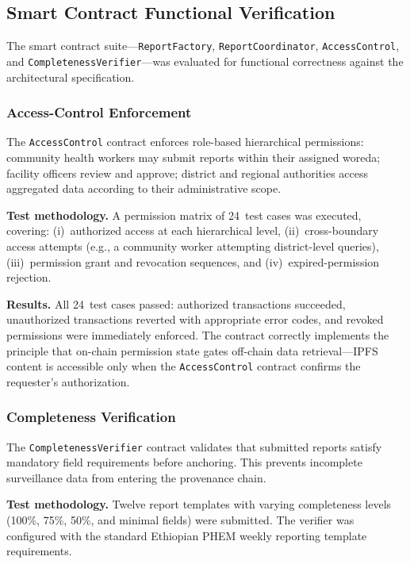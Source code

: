 \documentclass[AMA,LATO1COL]{WileyNJD-v2}
\begin{document}
\subsection{Smart Contract Functional Verification}\label{subsec:contract_eval}

The smart contract suite---\texttt{ReportFactory}, \texttt{ReportCoordinator}, \texttt{AccessControl}, and \texttt{CompletenessVerifier}---was evaluated for functional correctness against the architectural specification.

\subsubsection{Access-Control Enforcement}

The \texttt{AccessControl} contract enforces role-based hierarchical permissions: community health workers may submit reports within their assigned woreda; facility officers review and approve; district and regional authorities access aggregated data according to their administrative scope.

\textbf{Test methodology.} A permission matrix of 24~test cases was executed, covering: (i)~authorized access at each hierarchical level, (ii)~cross-boundary access attempts (e.g., a community worker attempting district-level queries), (iii)~permission grant and revocation sequences, and (iv)~expired-permission rejection.

\textbf{Results.} All 24~test cases passed: authorized transactions succeeded, unauthorized transactions reverted with appropriate error codes, and revoked permissions were immediately enforced. The contract correctly implements the principle that on-chain permission state gates off-chain data retrieval---IPFS content is accessible only when the \texttt{AccessControl} contract confirms the requester's authorization.

\subsubsection{Completeness Verification}

The \texttt{CompletenessVerifier} contract validates that submitted reports satisfy mandatory field requirements before anchoring. This prevents incomplete surveillance data from entering the provenance chain.

\textbf{Test methodology.} Twelve report templates with varying completeness levels (100\%, 75\%, 50\%, and minimal fields) were submitted. The verifier was configured with the standard Ethiopian PHEM weekly reporting template requirements.
\end{document}
